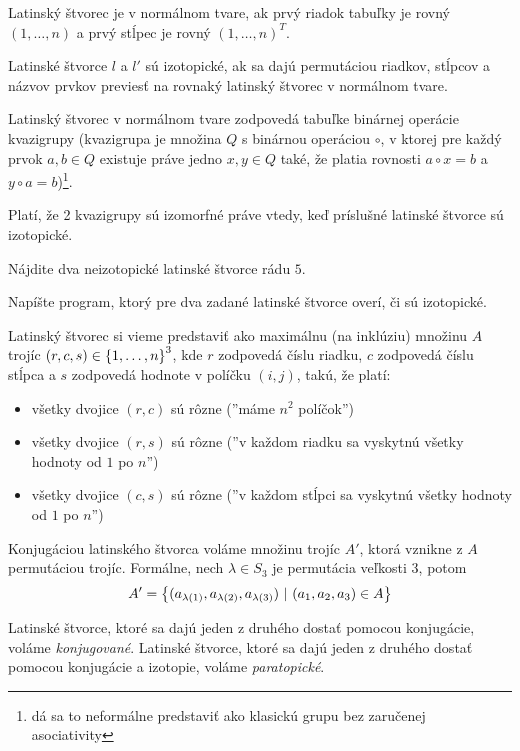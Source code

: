 \begin{definition}
Latinský štvorec je v normálnom tvare, ak prvý riadok tabuľky je rovný $(1, \ldots, n)$ a prvý stĺpec je rovný $(1, \ldots, n)^T$.
\end{definition}

\begin{definition}
Latinské štvorce $l$ a $l'$ sú izotopické, ak sa dajú permutáciou riadkov, stĺpcov a názvov prvkov previesť na rovnaký latinský štvorec v normálnom tvare.
\end{definition}

\begin{remark}
Latinský štvorec v normálnom tvare zodpovedá tabuľke binárnej operácie kvazigrupy 
(kvazigrupa je množina $Q$ s binárnou operáciou $\circ$, v ktorej pre každý prvok $a, b \in Q$ existuje práve jedno $x, y \in Q$ také, že platia rovnosti $a \circ x = b$ a $y \circ a = b$)\footnote{dá sa to neformálne predstaviť ako klasickú grupu bez zaručenej asociativity}.

Platí, že 2 kvazigrupy sú izomorfné práve vtedy, keď príslušné latinské štvorce sú izotopické.
\end{remark}


\begin{exercise}
Nájdite dva neizotopické latinské štvorce rádu $5$.
\end{exercise}


\begin{exercise}
Napíšte program, ktorý pre dva zadané latinské štvorce overí, či sú izotopické.
\end{exercise}



\begin{definition}
Latinský štvorec si vieme predstaviť ako maximálnu (na inklúziu) množinu $A$ trojíc $(r,c,s) \in \left\{1, \ldots, n\right\}^3$, 
kde $r$ zodpovedá číslu riadku, $c$ zodpovedá číslu stĺpca a $s$ zodpovedá hodnote v políčku $(i, j)$, 
takú, že platí:
\begin{itemize}
    \item všetky dvojice $(r, c)$ sú rôzne (''máme $n^2$ políčok'')
    \item všetky dvojice $(r, s)$ sú rôzne (''v každom riadku sa vyskytnú všetky hodnoty od $1$ po $n$'')
    \item všetky dvojice $(c, s)$ sú rôzne (''v každom stĺpci sa vyskytnú všetky hodnoty od $1$ po $n$'')
\end{itemize}  

Konjugáciou latinského štvorca voláme množinu trojíc $A'$, ktorá vznikne z $A$ permutáciou trojíc. Formálne,
nech $\lambda \in S_3$ je permutácia veľkosti $3$, potom $$A' = \left\{ (a_{\lambda(1)}, a_{\lambda(2)}, a_{\lambda(3)} ) ~|~ (a_1, a_2, a_3) \in A\right\}$$

Latinské štvorce, ktoré sa dajú jeden z druhého dostať pomocou konjugácie, voláme \emph{konjugované}.
Latinské štvorce, ktoré sa dajú jeden z druhého dostať pomocou konjugácie a izotopie, voláme \emph{paratopické}.

\end{definition}



